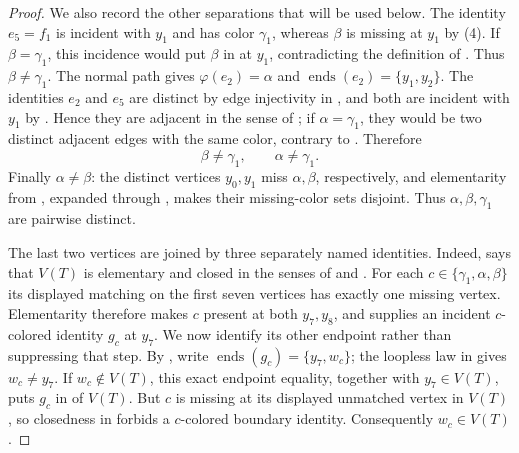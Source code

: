 \begin{proof}
We also record the other separations that will be used below.  The identity
$e_5=f_1$ is incident with $y_1$ and has color $\gamma_1$, whereas
$\beta$ is missing at $y_1$ by (4).  If $\beta=\gamma_1$, this incidence
would put $\beta$ in  at $y_1$, contradicting the
definition of .  Thus $\beta\ne\gamma_1$.  The
normal path gives $\varphi(e_2)=\alpha$ and
$\operatorname{ends}(e_2)=\{y_1,y_2\}$.  The identities $e_2$ and $e_5$
are distinct by edge injectivity in , and both are
incident with $y_1$ by .  Hence they are adjacent in the
sense of ; if $\alpha=\gamma_1$, they would be two
distinct adjacent edges with the same color, contrary to
.  Therefore
\[
 \beta\ne\gamma_1,\qquad \alpha\ne\gamma_1.          \tag{7a}
\]
Finally $\alpha\ne\beta$: the distinct vertices $y_0,y_1$ miss
$\alpha,\beta$, respectively, and elementarity from
, expanded through
, makes their missing-color sets
disjoint.  Thus $\alpha,\beta,\gamma_1$ are pairwise distinct.

The last two vertices are joined by three separately named identities.
Indeed,  says that $V(T)$ is elementary
and closed in the senses of  and
.  For each
$c\in\{\gamma_1,\alpha,\beta\}$ its displayed
matching on the first seven vertices has exactly one missing vertex.
Elementarity therefore makes $c$ present at both $y_7,y_8$, and
 supplies an incident $c$-colored identity $g_c$
at $y_7$.  We now identify its other endpoint rather than suppressing that
step.  By , write
$\operatorname{ends}(g_c)=\{y_7,w_c\}$; the loopless law in
 gives $w_c\ne y_7$.  If
$w_c\notin V(T)$, this exact endpoint equality, together with
$y_7\in V(T)$, puts $g_c$ in  of $V(T)$.  But $c$
is missing at its displayed unmatched vertex in $V(T)$, so closedness in
 forbids a $c$-colored boundary identity.
Consequently $w_c\in V(T)$.


\end{proof}
